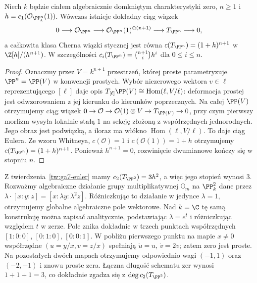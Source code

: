 \begin{twierdzenie}
\label{tw:ga7-euler}
Niech $k$ będzie ciałem algebraicznie domkniętym
charakterystyki zero, $n\ge1$ i
$h=c_1(\mathcal O_{\PP^n_k}(1))$.
Wówczas istnieje dokładny ciąg wiązek
\[
0\longrightarrow\mathcal O_{\PP^n}
\longrightarrow\mathcal O_{\PP^n}(1)^{\oplus(n+1)}
\longrightarrow T_{\PP^n}\longrightarrow0,
\]
a całkowita klasa Cherna wiązki stycznej jest równa
$c(T_{\PP^n})=(1+h)^{n+1}$ w
$\Z[h]/(h^{n+1})$. W szczególności
$c_i(T_{\PP^n})=\binom{n+1}{i}h^i$ dla $0\le i\le n$.
\end{twierdzenie}
\begin{proof}
Oznaczmy przez $V=k^{n+1}$ przestrzeń, której proste
parametryzuje $\PP^n=\PP(V)$ w konwencji prostych.
Wybór niezerowego wektora $v\in\ell$ reprezentującego
$[\ell]$ daje opis
$T_{[\ell]}\PP(V)\cong\operatorname{Hom}(\ell,V/\ell)$:
deformacja prostej jest odwzorowaniem z jej kierunku
do kierunków poprzecznych. Na całej $\PP(V)$ otrzymujemy
ciąg wiązek
$0\to\mathcal O\to\mathcal O(1)\otimes V
\to T_{\PP(V)}\to0$, przy czym pierwszy morfizm
wysyła lokalnie stałą $1$ na sekcję złożoną z
współrzędnych jednorodnych. Jego obraz jest podwiązką,
a iloraz ma włókno $\operatorname{Hom}(\ell,V/\ell)$.
To daje ciąg Eulera. Ze wzoru Whitneya,
$c(\mathcal O)=1$ i $c(\mathcal O(1))=1+h$
otrzymujemy $c(T_{\PP^n})=(1+h)^{n+1}$.
Ponieważ $h^{n+1}=0$, rozwinięcie dwumianowe
kończy się w stopniu $n$.
\end{proof}

\begin{przyklad}
\label{prz:ga7-vector-field}
Z twierdzenia~\ref{tw:ga7-euler} mamy
$c_2(T_{\PP^2})=3h^2$, a więc jego stopień wynosi $3$.
Rozważmy algebraiczne działanie grupy multiplikatywnej
$\mathbb G_m$ na $\PP^2_k$ dane przez
$\lambda\cdot[x:y:z]=[x:\lambda y:\lambda^2 z]$.
Różniczkując to działanie w jedynce $\lambda=1$,
otrzymujemy globalne algebraiczne pole wektorowe.
Nad $k=\C$ tę samą konstrukcję można zapisać
analitycznie, podstawiając $\lambda=e^t$
i różniczkując względem $t$ w zerze.
Pole znika dokładnie w trzech punktach współrzędnych
$[1:0:0]$, $[0:1:0]$, $[0:0:1]$.
W pobliżu pierwszego punktu na mapie $x\ne0$
współrzędne $(u=y/x,v=z/x)$ spełniają
$\dot u=u$, $\dot v=2v$; zatem zero jest proste.
Na pozostałych dwóch mapach otrzymujemy odpowiednio
wagi $(-1,1)$ oraz $(-2,-1)$ i znowu proste zera.
Łączna długość schematu zer wynosi $1+1+1=3$,
co dokładnie zgadza się z $\deg c_2(T_{\PP^2})$.
\end{przyklad}

